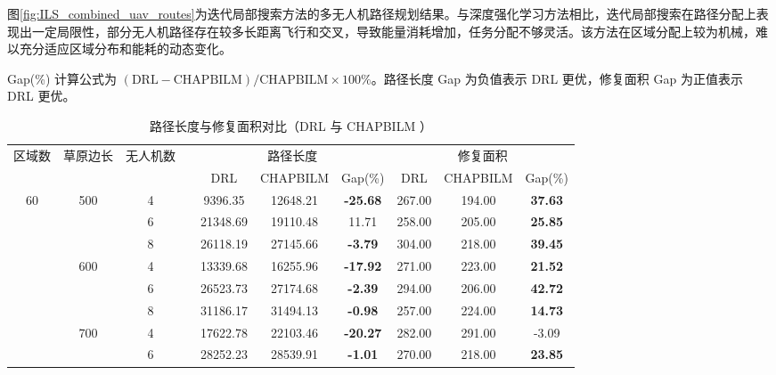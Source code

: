 \documentclass[AutoFakeBold]{LZUThesis}
\begin{document}
图\ref{fig:ILS_combined_uav_routes}为迭代局部搜索方法的多无人机路径规划结果。与深度强化学习方法相比，迭代局部搜索在路径分配上表现出一定局限性，部分无人机路径存在较多长距离飞行和交叉，导致能量消耗增加，任务分配不够灵活。该方法在区域分配上较为机械，难以充分适应区域分布和能耗的动态变化。

Gap(\%) 计算公式为 $(\text{DRL} - \text{CHAPBILM}) / \text{CHAPBILM} \times 100\%$。路径长度 Gap 为负值表示 DRL 更优，修复面积 Gap 为正值表示 DRL 更优。
\begin{table}[H]
	\centering
	\caption{路径长度与修复面积对比（DRL 与 CHAPBILM ）}
	\small
	\setlength{\tabcolsep}{3.5pt}
	\begin{tabular}{cccc ccc ccc}
		\toprule
		区域数                 & 草原边长                 & 无人机数 &  & \multicolumn{3}{c}{路径长度} & \multicolumn{3}{c}{修复面积}                                       \\
		\cmidrule(lr){5-7} \cmidrule(lr){8-10}
							&                      &      &  & DRL                      & CHAPBILM                       & Gap(\%) & DRL    & CHAPBILM     & Gap(\%) \\
		\midrule
		\multirow{9}{*}{60} & \multirow{3}{*}{500} & 4    &  & 9396.35                  & 12648.21                 & \textbf{-25.68}  & 267.00 & 194.00 & \textbf{37.63}   \\
							&                      & 6    &  & 21348.69                 & 19110.48                 & 11.71   & 258.00 & 205.00 & \textbf{25.85}   \\
							&                      & 8    &  & 26118.19                 & 27145.66                 & \textbf{-3.79}   & 304.00 & 218.00 & \textbf{39.45}   \\
		\cmidrule(lr){2-10}
							& \multirow{3}{*}{600} & 4    &  & 13339.68                 & 16255.96                 & \textbf{-17.92}  & 271.00 & 223.00 & \textbf{21.52}   \\
							&                      & 6    &  & 26523.73                 & 27174.68                 & \textbf{-2.39}   & 294.00 & 206.00 & \textbf{42.72}   \\
							&                      & 8    &  & 31186.17                 & 31494.13                 & \textbf{-0.98}   & 257.00 & 224.00 & \textbf{14.73}   \\
		\cmidrule(lr){2-10}
							& \multirow{3}{*}{700} & 4    &  & 17622.78                 & 22103.46                 & \textbf{-20.27}  & 282.00 & 291.00 & -3.09   \\
							&                      & 6    &  & 28252.23                 & 28539.91                 & \textbf{-1.01}   & 270.00 & 218.00 & \textbf{23.85}   \\

\end{tabular}
\end{table}
\end{document}
